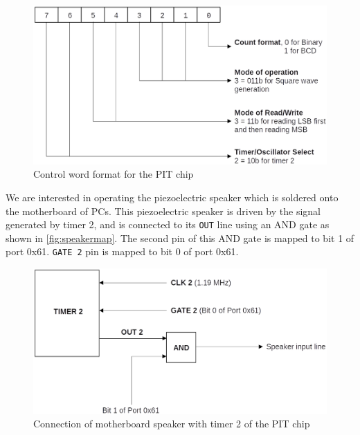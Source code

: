 \begin{figure}[h]
  \centering
  \includegraphics[scale=0.25]{figures/8254cwr.eps}
  \caption{Control word format for the PIT chip}
\label{fig:8254cwr}
\end{figure}

We are interested in operating the piezoelectric speaker which is soldered onto the motherboard of PCs. This piezoelectric speaker is driven by the signal generated by timer 2, and is connected to its \texttt{OUT} line using an AND gate as shown in \autoref{fig:speakermap}. The second pin of this AND gate is mapped to bit 1 of port 0x61. \texttt{GATE 2} pin is mapped to bit 0 of port 0x61.

\begin{figure}[h]
  \centering
  \includegraphics[scale=0.25]{figures/speakermap.eps}
  \caption{Connection of motherboard speaker with timer 2 of the PIT chip}
\label{fig:speakermap}
\end{figure}


